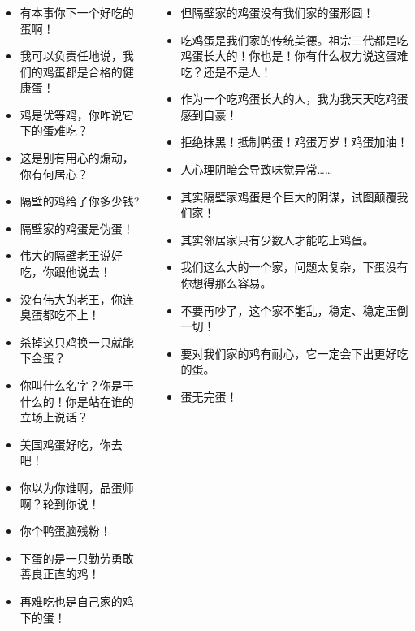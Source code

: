 \documentclass[UTF8,aspectratio=43,11pt,colorlinks,compress,openany]{beamer}%
\begin{document}
\begin{frame}\frametitle{}
\centering{\large\textcolor{red}{“这鸡蛋真难吃。”}}\footnotesize
\begin{columns}[onlytextwidth]
\begin{itemize}
	\item 有本事你下一个好吃的蛋啊！
	\item 我可以负责任地说，我们的鸡蛋都是合格的健康蛋！
	\item 鸡是优等鸡，你咋说它下的蛋难吃？
	\item 这是别有用心的煽动，你有何居心？
	\item 隔壁的鸡给了你多少钱?
	\item 隔壁家的鸡蛋是伪蛋！
	\item 伟大的隔壁老王说好吃，你跟他说去！
	\item 没有伟大的老王，你连臭蛋都吃不上！
	\item 杀掉这只鸡换一只就能下金蛋？
	\item 你叫什么名字？你是干什么的！你是站在谁的立场上说话？
	\item 美国鸡蛋好吃，你去吧！
	\item 你以为你谁啊，品蛋师啊？轮到你说！
	\item 你个鸭蛋脑残粉！
	\item 下蛋的是一只勤劳勇敢善良正直的鸡！
	\item 再难吃也是自己家的鸡下的蛋！
\end{itemize}
\begin{itemize}
	\item 但隔壁家的鸡蛋没有我们家的蛋形圆！
	\item 吃鸡蛋是我们家的传统美德。祖宗三代都是吃鸡蛋长大的！你也是！你有什么权力说这蛋难吃？还是不是人！
	\item 作为一个吃鸡蛋长大的人，我为我天天吃鸡蛋感到自豪！
	\item 拒绝抹黑！抵制鸭蛋！鸡蛋万岁！鸡蛋加油！
	\item 人心理阴暗会导致味觉异常……
	\item 其实隔壁家鸡蛋是个巨大的阴谋，试图颠覆我们家！
	\item 其实邻居家只有少数人才能吃上鸡蛋。
	\item 我们这么大的一个家，问题太复杂，下蛋没有你想得那么容易。
	\item 不要再吵了，这个家不能乱，稳定、稳定压倒一切！
	\item 要对我们家的鸡有耐心，它一定会下出更好吃的蛋。
	\item 蛋无完蛋！
\end{itemize}
\end{columns}
\end{frame}
\end{document}
